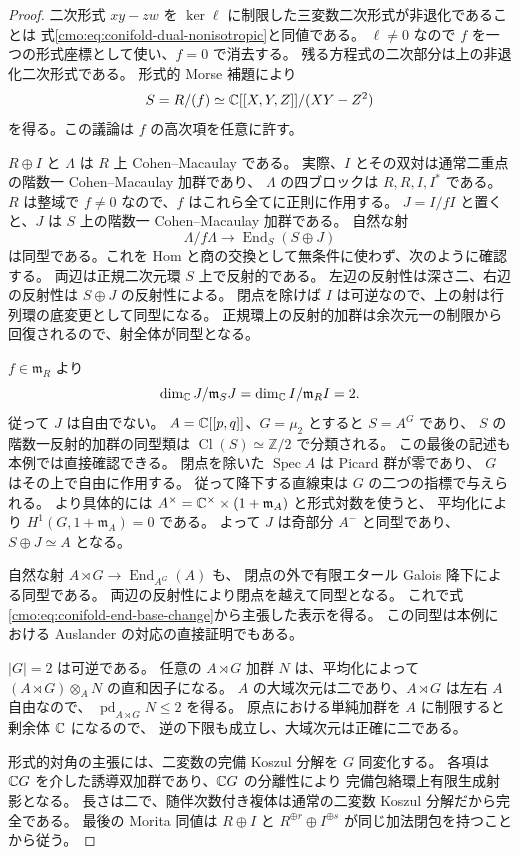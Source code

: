 \begin{proof}
二次形式 $xy-zw$ を $\ker\ell$ に制限した三変数二次形式が非退化であることは
式\eqref{cmo:eq:conifold-dual-nonisotropic}と同値である。
$\ell\ne0$ なので $f$ を一つの形式座標として使い、$f=0$ で消去する。
残る方程式の二次部分は上の非退化二次形式である。
形式的 Morse 補題により
\[
 S=R/(f)\simeq\mathbb C[[X,Y,Z]]/(XY-Z^2)
\]
を得る。この議論は $f$ の高次項を任意に許す。

$R\oplus I$ と $\Lambda$ は $R$ 上 Cohen--Macaulay である。
実際、$I$ とその双対は通常二重点の階数一 Cohen--Macaulay 加群であり、
$\Lambda$ の四ブロックは $R,R,I,I^*$ である。
$R$ は整域で $f\ne0$ なので、$f$ はこれら全てに正則に作用する。
$J=I/fI$ と置くと、$J$ は $S$ 上の階数一 Cohen--Macaulay 加群である。
自然な射
\begin{equation}\label{cmo:eq:conifold-end-base-change}
 \Lambda/f\Lambda\longrightarrow
     \operatorname{End}_S(S\oplus J)
\end{equation}
は同型である。これを Hom と商の交換として無条件に使わず、次のように確認する。
両辺は正規二次元環 $S$ 上で反射的である。
左辺の反射性は深さ二、右辺の反射性は $S\oplus J$ の反射性による。
閉点を除けば $I$ は可逆なので、上の射は行列環の底変更として同型になる。
正規環上の反射的加群は余次元一の制限から回復されるので、射全体が同型となる。

$f\in\mathfrak m_R$ より
\[
 \dim_\mathbb C J/\mathfrak m_SJ
 =\dim_\mathbb C I/\mathfrak m_RI=2.
\]
従って $J$ は自由でない。
$A=\mathbb C[[p,q]]$、$G=\mu_2$ とすると $S=A^G$ であり、
$S$ の階数一反射的加群の同型類は $\operatorname{Cl}(S)\simeq\mathbb Z/2$ で分類される。
この最後の記述も本例では直接確認できる。
閉点を除いた $\operatorname{Spec}A$ は Picard 群が零であり、
$G$ はその上で自由に作用する。
従って降下する直線束は $G$ の二つの指標で与えられる。
より具体的には $A^\times=\mathbb C^\times\times(1+\mathfrak m_A)$ と形式対数を使うと、
平均化により $H^1(G,1+\mathfrak m_A)=0$ である。
よって $J$ は奇部分 $A^-$ と同型であり、$S\oplus J\simeq A$ となる。

自然な射 $A\rtimes G\to\operatorname{End}_{A^G}(A)$ も、
閉点の外で有限エタール Galois 降下による同型である。
両辺の反射性により閉点を越えて同型となる。
これで式\eqref{cmo:eq:conifold-end-base-change}から主張した表示を得る。
この同型は本例における Auslander の対応の直接証明でもある。

$|G|=2$ は可逆である。
任意の $A\rtimes G$ 加群 $N$ は、平均化によって
$(A\rtimes G)\otimes_A N$ の直和因子になる。
$A$ の大域次元は二であり、$A\rtimes G$ は左右 $A$ 自由なので、
$\operatorname{pd}_{A\rtimes G}N\le2$ を得る。
原点における単純加群を $A$ に制限すると剰余体 $\mathbb C$ になるので、
逆の下限も成立し、大域次元は正確に二である。

形式的対角の主張には、二変数の完備 Koszul 分解を $G$ 同変化する。
各項は $\mathbb C G$ を介した誘導双加群であり、$\mathbb C G$ の分離性により
完備包絡環上有限生成射影となる。
長さは二で、随伴次数付き複体は通常の二変数 Koszul 分解だから完全である。
最後の Morita 同値は $R\oplus I$ と $R^{\oplus r}\oplus I^{\oplus s}$ が同じ加法閉包を持つことから従う。
\end{proof}

